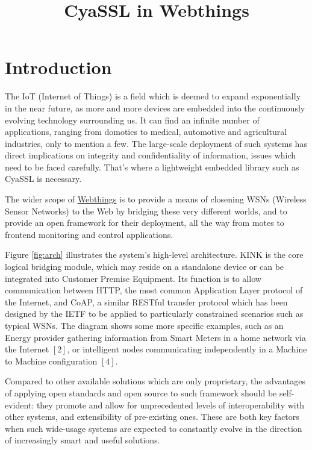 \documentclass[10pt]{article}
\title{\textbf{CyaSSL in Webthings}}
\author{}
\date{}
\begin{document}
\maketitle
 
\vspace{1cm}
\section{Introduction}

The IoT (Internet of Things) is a field which is deemed to expand exponentially in the near future, as more and more devices are embedded into the continuously evolving technology surrounding us. It can find an infinite number of applications, ranging from domotics to medical, automotive and agricultural industries, only to mention a few. The large-scale deployment of such systems has direct implications on integrity and confidentiality of information, issues which need to be faced carefully. That's where a lightweight embedded library such as CyaSSL is necessary.

The wider scope of \href{http://github.com/koanlogic/webthings}{Webthings} is to provide a means of closening WSNs (Wireless Sensor Networks) to the Web by bridging these very different worlds, and to provide an open framework for their deployment, all the way from motes to frontend monitoring and control applications.

Figure \ref{fig:arch} illustrates the system's high-level architecture. KINK is the core logical bridging module, which may reside on a standalone device or can be integrated into Customer Premise Equipment. Its function is to allow communication between HTTP, the most common Application Layer protocol of the Internet, and CoAP, a similar RESTful transfer protocol which has been designed by the IETF to be applied to particularly constrained scenarios such as typical WSNs. 
The diagram shows some more specific examples, such as an Energy provider gathering information from Smart Meters in a home network via the Internet $[2]$, or intelligent nodes communicating independently in a Machine to Machine configuration $[4]$.

Compared to other available solutions which are only proprietary, the advantages of applying open standards and open source to such framework should be self-evident: they promote and allow for unprecedented levels of interoperability with other systems, and extensibility of pre-existing ones. These are both key factors when such wide-usage systems are expected to constantly evolve in the direction of increasingly smart and useful solutions.
\end{document}
